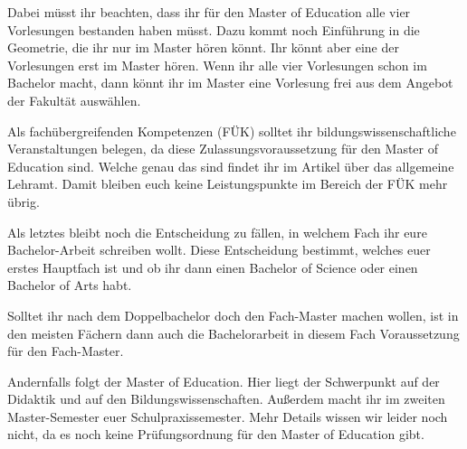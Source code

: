 Dabei müsst ihr beachten, dass ihr für den Master of Education alle vier
Vorlesungen bestanden haben müsst. Dazu kommt noch Einführung in die Geometrie,
die ihr nur im Master hören könnt. Ihr könnt aber eine der Vorlesungen erst im
Master hören. Wenn ihr alle vier Vorlesungen schon im Bachelor macht, dann
könnt ihr im Master eine Vorlesung frei aus dem Angebot der Fakultät
auswählen.

Als fachübergreifenden Kompetenzen (FÜK) solltet ihr bildungswissenschaftliche
Veranstaltungen belegen, da diese Zulassungsvoraussetzung für den Master of
Education sind. Welche genau das sind findet ihr im Artikel über das allgemeine
Lehramt. Damit bleiben euch keine Leistungspunkte im Bereich der FÜK mehr übrig.

Als letztes bleibt noch die Entscheidung zu fällen, in welchem Fach ihr eure
Bachelor-Arbeit schreiben wollt. Diese Entscheidung bestimmt, welches euer
erstes Hauptfach ist und ob ihr dann einen Bachelor of Science oder einen
Bachelor of Arts habt.

Solltet ihr nach dem Doppelbachelor doch den Fach-Master machen wollen, ist in
den meisten Fächern dann auch die Bachelorarbeit in diesem Fach Voraussetzung
für den Fach-Master.

Andernfalls folgt der Master of Education. Hier liegt der Schwerpunkt auf der
Didaktik und auf den Bildungswissenschaften. Außerdem macht ihr im zweiten
Master-Semester euer Schulpraxissemester. Mehr Details wissen wir leider noch
nicht, da es noch keine Prüfungsordnung für den Master of Education gibt.
